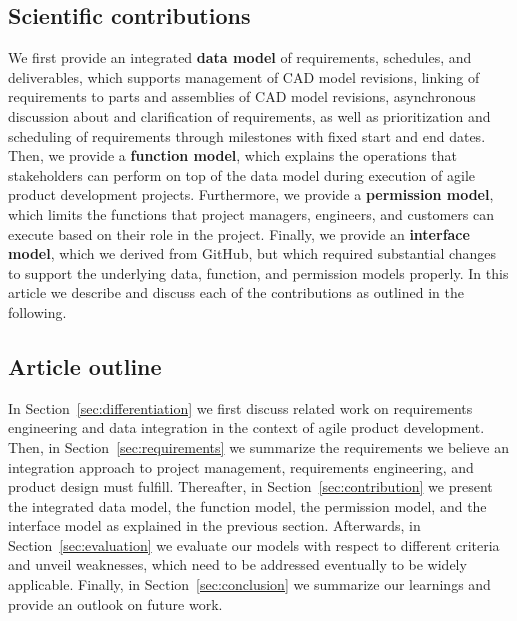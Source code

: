    \subsection*{Scientific contributions}
    We first provide an integrated \textbf{data model} of requirements, schedules, and deliverables, which supports management of CAD model revisions, linking of requirements to parts and assemblies of CAD model revisions, asynchronous discussion about and clarification of requirements, as well as prioritization and scheduling of requirements through milestones with fixed start and end dates.
    Then, we provide a \textbf{function model}, which explains the operations that stakeholders can perform on top of the data model during execution of agile product development projects.
    Furthermore, we provide a \textbf{permission model}, which limits the functions that project managers, engineers, and customers can execute based on their role in the project.
    Finally, we provide an \textbf{interface model}, which we derived from GitHub, but which required substantial changes to support the underlying data, function, and permission models properly.
    In this article we describe and discuss each of the contributions as outlined in the following.

    \subsection*{Article outline}
    In Section~\ref{sec:differentiation} we first discuss related work on requirements engineering and data integration in the context of agile product development.
    Then, in Section~\ref{sec:requirements} we summarize the requirements we believe an integration approach to project management, requirements engineering, and product design must fulfill.
    Thereafter, in Section~\ref{sec:contribution} we present the integrated data model, the function model, the permission model, and the interface model as explained in the previous section.
    Afterwards, in Section~\ref{sec:evaluation} we evaluate our models with respect to different criteria and unveil weaknesses, which need to be addressed eventually to be widely applicable.
    Finally, in Section~\ref{sec:conclusion} we summarize our learnings and provide an outlook on future work.
    
